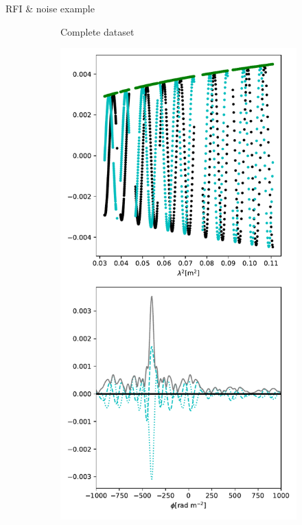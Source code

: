 \documentclass[xetex,aspectratio=169]{beamer}
\begin{document}
\begin{frame}{RFI \& noise example}
\begin{figure}
\begin{subfigure}{0.2\textwidth}
                \caption{Complete dataset}
            \end{subfigure}
            \begin{subfigure}{0.2\textwidth}
                \includegraphics[width=\textwidth]{figures/dataset_features/data_removed.pdf}

\end{subfigure}
\end{figure}
\end{frame}
\end{document}
